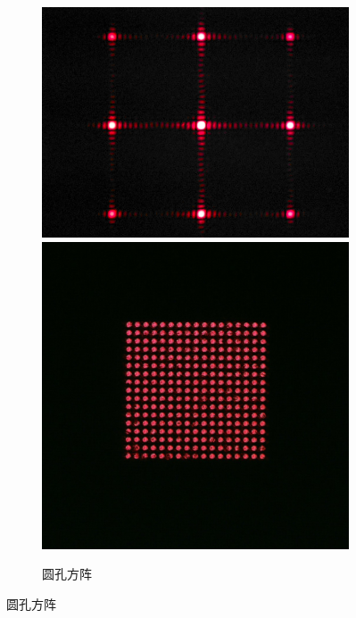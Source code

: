 \documentclass[a4paper]{article}
\begin{document}
\clearpage
\begin{figure}[htbp]\ContinuedFloat
    \centering
    \begin{subfigure}[htbp]{0.3\textwidth}
        \centering
        \includegraphics[width=\textwidth]{fre-done/1-7.JPG}
        \includegraphics[width=\textwidth]{img-done/1-7.JPG}
        \caption{圆孔方阵}

\end{subfigure}
\end{figure}
\end{document}
